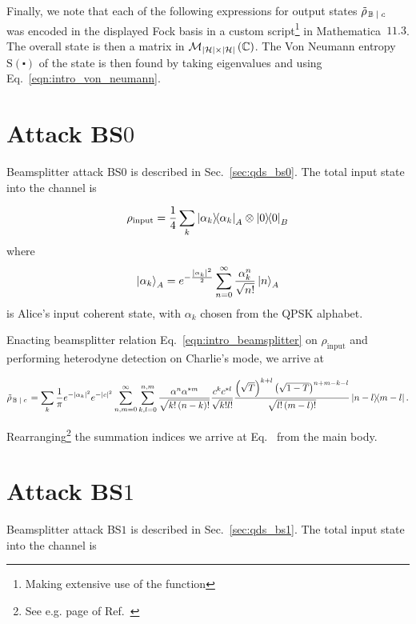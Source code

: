 Finally, we note that each of the following expressions for output states $\tilde{\rho}_{\left. \mathbb{B} \; \middle| \; c\right.}$ was encoded in the displayed Fock basis in a custom script\footnote{Making extensive use of the  function} in Mathematica~$11.3$. The overall state is then a matrix in $\mathcal{M}_{\left|\mathcal{H}\right| \times \left|\mathcal{H}\right|}\left(\mathbb{C}\right)$. The Von Neumann entropy $\text{S}\left(\centerdot\right)$ of the state is then found by taking eigenvalues and using Eq.~\ref{eqn:intro_von_neumann}.

\section{Attack BS$0$}
Beamsplitter attack BS$0$ is described in Sec.~\ref{sec:qds_bs0}. The total input state into the channel is

\begin{equation}
\rho_{\text{input}} = \frac{1}{4}\sum_k \dyad{\alpha_k}_A \otimes \dyad{0}_B
\end{equation}
where
\begin{equation}
\ket{\alpha_k}_A = e^{- \frac{\left| \alpha_k \right|^2}{2}} \sum_{n=0}^\infty \frac{\alpha_k^n}{\sqrt{n!}} \ket{n}_A
\end{equation}
is Alice's input coherent state, with $\alpha_k$ chosen from the QPSK alphabet. 

Enacting beamsplitter relation Eq.~\ref{eqn:intro_beamsplitter} on $\rho_{\text{input}}$ and performing heterodyne detection on Charlie's mode, we arrive at 

\begin{equation}
\tilde{\rho}_{\left. \mathbb{B} \given c \right.} = \sum_k \frac{1}{\pi} e^{-\left|\alpha_k\right|^2}  e^{-\left|c\right|^2} \sum_{n, m = 0}^\infty \sum_{k, l = 0}^{n, m} \frac{\alpha^n \alpha^{* m}}{\sqrt{k! \left(n - k\right)!}} \frac{c^k c^{* l}}{\sqrt{k! l!}} \frac{\left(\sqrt{T}\right)^{k+l} \left(\sqrt{1-T}\right)^{n + m - k - l}}{\sqrt{l! \left(m-l\right)!}} \dyad{n-l}{m-l}.
\end{equation}

\noindent Rearranging\footnote{See e.g. page  of Ref.~\cite{GerryandKnight}} the summation indices we arrive at Eq.~ from the main body.

\section{Attack BS$1$}
Beamsplitter attack BS$1$ is described in Sec.~\ref{sec:qds_bs1}. The total input state into the channel is 

